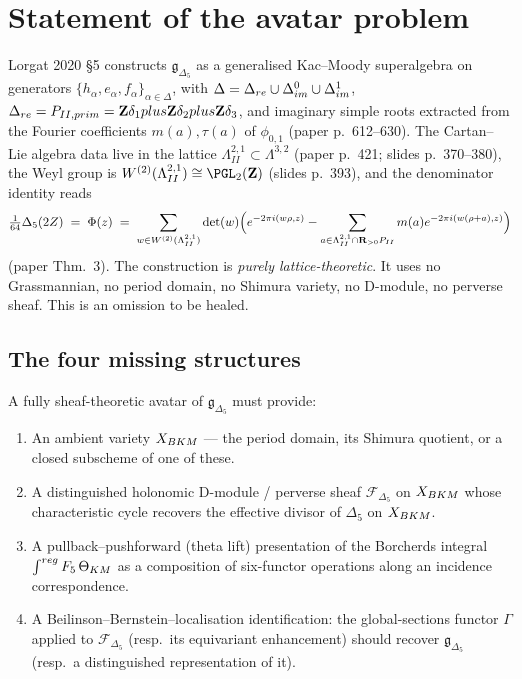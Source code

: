 \documentclass[11pt]{amsart}
\theoremstyle{definition}
\providecommand{\cF}{\mathcal{F}}
\providecommand{\bZ}{\mathbf{Z}}
\providecommand{\bR}{\mathbf{R}}
\providecommand{\Dfive}{\Delta_5}
\providecommand{\gDfive}{\mathfrak{g}_{\Dfive}}
\begin{document}
\section{Statement of the avatar problem}\label{sec:statement}

Lorgat 2020 \S5 constructs $\gDfive$ as a generalised Kac--Moody
superalgebra on generators $\{h_\alpha, e_\alpha, f_\alpha\}_{\alpha \in
\Delta}$, with
$\Delta = \Delta_{\rm re} \cup \Delta^0_{\rm im} \cup \Delta^1_{\rm im}$,
$\Delta_{\rm re} = \cP_{II,\mathrm{prim}} = \bZ\delta_1 \oplus
\bZ\delta_2 \oplus \bZ\delta_3$, and imaginary simple roots extracted
from the Fourier coefficients $m(a), \tau(a)$ of $\phi_{0,1}$
(paper p.~612--630). The Cartan--Lie algebra data live in the
lattice $\Lambda^{2,1}_{II} \subset \Lambda^{3,2}$ (paper p.~421;
slides p.~370--380), the Weyl group is $W^{(2)}(\Lambda^{2,1}_{II})
\cong \PGL_2(\bZ)$ (slides p.~393), and the denominator identity reads
\begin{equation}\label{eq:denom}
 \tfrac{1}{64}\Dfive(2Z) \;=\; \Phi(z)
 \;=\; \sum_{w \in W^{(2)}(\Lambda^{2,1}_{II})} \det(w)
 \Big(e^{-2\pi i (w\rho, z)} - \sum_{a \in \Lambda^{2,1}_{II} \cap
 \bR_{>0}\cP_{II}} m(a) e^{-2\pi i (w(\rho+a), z)}\Big)
\end{equation}
(paper Thm.~3). The construction is \emph{purely lattice-theoretic}.
It uses no Grassmannian, no period domain, no Shimura variety, no
D-module, no perverse sheaf. This is an omission to be healed.

\subsection{The four missing structures}

A fully sheaf-theoretic avatar of $\gDfive$ must provide:
\begin{enumerate}[label=(S\arabic*)]
 \item An ambient variety $X_{\rm BKM}$ --- the period domain, its
   Shimura quotient, or a closed subscheme of one of these.
 \item A distinguished holonomic D-module / perverse sheaf
   $\cF_{\Dfive}$ on $X_{\rm BKM}$ whose characteristic cycle recovers
   the effective divisor of $\Dfive$ on $X_{\rm BKM}$.
 \item A pullback--pushforward (theta lift) presentation of the
   Borcherds integral $\int^{\rm reg} F_5\, \Theta_{\rm KM}$ as a
   composition of six-functor operations along an incidence
   correspondence.
 \item A Beilinson--Bernstein--localisation identification: the
   global-sections functor $\Gamma$ applied to $\cF_{\Dfive}$ (resp.\
   its equivariant enhancement) should recover $\gDfive$ (resp.\ a
   distinguished representation of it).
\end{enumerate}
\end{document}
